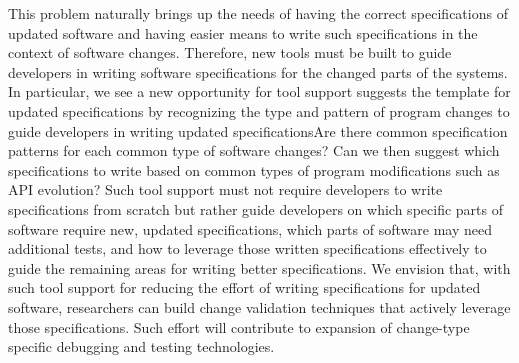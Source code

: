 This problem naturally brings up the needs of having the correct specifications of updated software and having easier means to write such specifications in the context of software changes. Therefore, new tools must be built to guide developers in writing software specifications for the changed parts of the systems. In particular, we see a new opportunity for tool support suggests the template for updated specifications by recognizing the type and pattern of program changes to guide developers in writing updated specifications\textemdash Are there common specification patterns for each common type of software changes? Can we then suggest which specifications to write based on common types of program modifications such as API evolution? Such tool support must not require developers to write specifications from scratch but rather guide developers on which specific parts of software require new, updated specifications, which parts of software may need additional tests, and how to leverage those written specifications effectively to guide the remaining areas for writing better specifications. We envision that, with such tool support for reducing the effort of writing specifications for updated software, researchers can build change validation techniques that actively leverage those specifications. Such effort will contribute to expansion of change-type specific debugging and testing technologies. 

